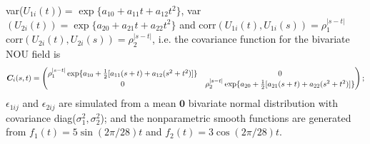 \documentclass[article,lineno]{biometrika}
\begin{document}
var($U_{1i}(t)$) = $\exp\{a_{10} + a_{11}t + a_{12}t^2 \}$,
var
$
(U_{2i}(t)) = \exp\{a_{20} + a_{21}t + a_{22}t^2 \}
$
and 
corr$(U_{1i} (t), U_{1i}(s)) = \rho_1^{|s-t|}$
corr$(U_{2i} (t), U_{2i}(s)) = \rho_2^{|s-t|}$, i.e. the covariance function for the bivariate NOU field is 
\[
\boldsymbol C_i(s, t)
= 
\begin{pmatrix}
\rho_1^{|s-t|} \exp\{a_{10} + {1 \over 2}[a_{11}(s+t) + a_{12}(s^2+t^2)] \} &  0  \\
0 & \rho_2^{|s-t|}\exp\{a_{20} + {1 \over 2}[a_{21}(s+t) + a_{22}(s^2+t^2)]\}
\end{pmatrix};
\] 
$\epsilon_{1ij}$ and $\epsilon_{2ij}$ are simulated from a mean $\bm 0$ bivariate normal distribution with covariance diag($\sigma_1^2, \sigma_2^2$);
and the nonparametric smooth functions are generated from 
$f_1 (t) = 5 \sin\left({2\pi / 28}\right)t$ and
$f_2 (t) = 3 \cos\left({2\pi / 28}\right)t$.
\end{document}
